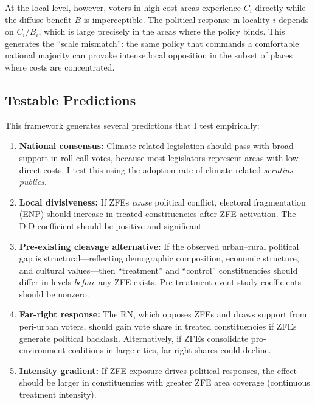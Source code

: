 \documentclass[12pt]{article}
\begin{document}
At the local level, however, voters in high-cost areas experience $C_i$ directly while the diffuse benefit $B$ is imperceptible. The political response in locality $i$ depends on $C_i / B_i$, which is large precisely in the areas where the policy binds. This generates the ``scale mismatch'': the same policy that commands a comfortable national majority can provoke intense local opposition in the subset of places where costs are concentrated.

\subsection{Testable Predictions}

This framework generates several predictions that I test empirically:

\begin{enumerate}
\item \textbf{National consensus:} Climate-related legislation should pass with broad support in roll-call votes, because most legislators represent areas with low direct costs. I test this using the adoption rate of climate-related \textit{scrutins publics}.

\item \textbf{Local divisiveness:} If ZFEs \textit{cause} political conflict, electoral fragmentation (ENP) should increase in treated constituencies after ZFE activation. The DiD coefficient should be positive and significant.

\item \textbf{Pre-existing cleavage alternative:} If the observed urban--rural political gap is structural---reflecting demographic composition, economic structure, and cultural values---then ``treatment'' and ``control'' constituencies should differ in levels \textit{before} any ZFE exists. Pre-treatment event-study coefficients should be nonzero.

\item \textbf{Far-right response:} The RN, which opposes ZFEs and draws support from peri-urban voters, should gain vote share in treated constituencies if ZFEs generate political backlash. Alternatively, if ZFEs consolidate pro-environment coalitions in large cities, far-right shares could decline.

\item \textbf{Intensity gradient:} If ZFE exposure drives political responses, the effect should be larger in constituencies with greater ZFE area coverage (continuous treatment intensity).
\end{enumerate}
\end{document}
